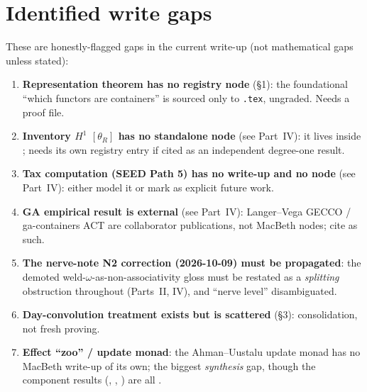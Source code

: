 \documentclass[11pt]{article}
\begin{document}
\section{Identified write gaps}
These are honestly-flagged gaps in the current write-up (not mathematical gaps unless stated):
\begin{enumerate}[leftmargin=1.4em]
\item \textbf{Representation theorem has no registry node} (\S1): the foundational ``which functors
are containers'' is sourced only to \texttt{.tex}, ungraded. Needs a proof file.
\item \textbf{Inventory $H^1$ $[θ_R]$ has no standalone node} (see Part~IV): it lives inside
; needs its own registry entry if cited as an independent degree-one
result.
\item \textbf{Tax computation (SEED Path 5) has no write-up and no node} (see Part~IV): either model
it or mark as explicit future work.
\item \textbf{GA empirical result is external} (see Part~IV): Langer--Vega GECCO / ga-containers ACT
are collaborator publications, not MacBeth nodes; cite as such.
\item \textbf{The nerve-note N2 correction (2026-10-09) must be propagated}: the demoted
weld-$ω$-as-non-associativity gloss must be restated as a \emph{splitting} obstruction throughout
(Parts~II, IV), and ``nerve level'' disambiguated.
\item \textbf{Day-convolution treatment exists but is scattered} (\S3): consolidation, not fresh
proving.
\item \textbf{Effect ``zoo'' / update monad}: the Ahman--Uustalu update monad has no MacBeth
write-up of its own; the biggest \emph{synthesis} gap, though the component results
(, , ) are all
.
\end{enumerate}
\end{document}
